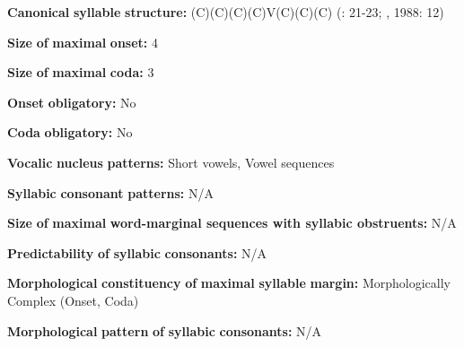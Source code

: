 \documentclass[output=paper]{langsci/langscibook}
\begin{document}
\begin{styleBody}
\textbf{Canonical} \textbf{syllable} \textbf{structure:} (C)(C)(C)(C)V(C)(C)(C) (\citealt{Bonvillain1973}: 21-23; \citealt{Michelson1981}, 1988: 12)
\end{styleBody}

\begin{styleBody}
\textbf{Size} \textbf{of} \textbf{maximal} \textbf{onset:} 4
\end{styleBody}

\begin{styleBody}
\textbf{Size} \textbf{of} \textbf{maximal} \textbf{coda:} 3
\end{styleBody}

\begin{styleBody}
\textbf{Onset} \textbf{obligatory:} No
\end{styleBody}

\begin{styleBody}
\textbf{Coda} \textbf{obligatory:} No
\end{styleBody}

\begin{styleBody}
\textbf{Vocalic} \textbf{nucleus} \textbf{patterns:} Short vowels, Vowel sequences
\end{styleBody}

\begin{styleBody}
\textbf{Syllabic} \textbf{consonant} \textbf{patterns:} N/A
\end{styleBody}

\begin{styleBody}
\textbf{Size} \textbf{of} \textbf{maximal} \textbf{word{}-marginal sequences with syllabic obstruents:} N/A
\end{styleBody}

\begin{styleBody}
\textbf{Predictability} \textbf{of} \textbf{syllabic} \textbf{consonants:} N/A
\end{styleBody}

\begin{styleBody}
\textbf{Morphological} \textbf{constituency} \textbf{of} \textbf{maximal} \textbf{syllable} \textbf{margin:} Morphologically Complex (Onset, Coda)
\end{styleBody}

\begin{styleBody}
\textbf{Morphological} \textbf{pattern} \textbf{of} \textbf{syllabic} \textbf{consonants:} N/A
\end{styleBody}
\end{document}
